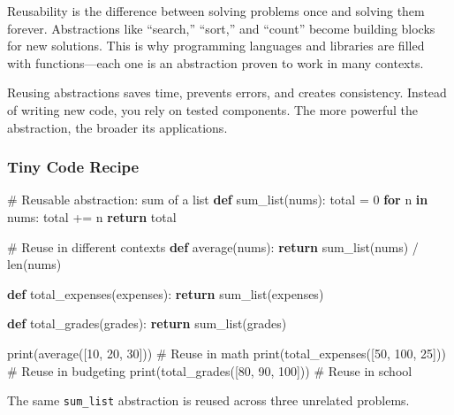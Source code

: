\documentclass[
  letterpaper,
  DIV=11,
  numbers=noendperiod]{scrreprt}
\newenvironment{Shaded}{\begin{snugshade}}{\end{snugshade}}
\newcommand{\BuiltInTok}[1]{\textcolor[rgb]{0.00,0.23,0.31}{#1}}
\newcommand{\CommentTok}[1]{\textcolor[rgb]{0.37,0.37,0.37}{#1}}
\newcommand{\ControlFlowTok}[1]{\textcolor[rgb]{0.00,0.23,0.31}{\textbf{#1}}}
\newcommand{\DecValTok}[1]{\textcolor[rgb]{0.68,0.00,0.00}{#1}}
\newcommand{\KeywordTok}[1]{\textcolor[rgb]{0.00,0.23,0.31}{\textbf{#1}}}
\newcommand{\NormalTok}[1]{\textcolor[rgb]{0.00,0.23,0.31}{#1}}
\newcommand{\OperatorTok}[1]{\textcolor[rgb]{0.37,0.37,0.37}{#1}}
\begin{document}
Reusability is the difference between solving problems once and solving
them forever. Abstractions like ``search,'' ``sort,'' and ``count''
become building blocks for new solutions. This is why programming
languages and libraries are filled with functions---each one is an
abstraction proven to work in many contexts.

Reusing abstractions saves time, prevents errors, and creates
consistency. Instead of writing new code, you rely on tested components.
The more powerful the abstraction, the broader its applications.

\subsubsection{Tiny Code Recipe}\label{tiny-code-recipe-46}

\begin{Shaded}
\begin{Highlighting}[]
\CommentTok{\# Reusable abstraction: sum of a list}
\KeywordTok{def}\NormalTok{ sum\_list(nums):}
\NormalTok{    total }\OperatorTok{=} \DecValTok{0}
    \ControlFlowTok{for}\NormalTok{ n }\KeywordTok{in}\NormalTok{ nums:}
\NormalTok{        total }\OperatorTok{+=}\NormalTok{ n}
    \ControlFlowTok{return}\NormalTok{ total}

\CommentTok{\# Reuse in different contexts}
\KeywordTok{def}\NormalTok{ average(nums):}
    \ControlFlowTok{return}\NormalTok{ sum\_list(nums) }\OperatorTok{/} \BuiltInTok{len}\NormalTok{(nums)}

\KeywordTok{def}\NormalTok{ total\_expenses(expenses):}
    \ControlFlowTok{return}\NormalTok{ sum\_list(expenses)}

\KeywordTok{def}\NormalTok{ total\_grades(grades):}
    \ControlFlowTok{return}\NormalTok{ sum\_list(grades)}

\BuiltInTok{print}\NormalTok{(average([}\DecValTok{10}\NormalTok{, }\DecValTok{20}\NormalTok{, }\DecValTok{30}\NormalTok{]))        }\CommentTok{\# Reuse in math}
\BuiltInTok{print}\NormalTok{(total\_expenses([}\DecValTok{50}\NormalTok{, }\DecValTok{100}\NormalTok{, }\DecValTok{25}\NormalTok{])) }\CommentTok{\# Reuse in budgeting}
\BuiltInTok{print}\NormalTok{(total\_grades([}\DecValTok{80}\NormalTok{, }\DecValTok{90}\NormalTok{, }\DecValTok{100}\NormalTok{]))   }\CommentTok{\# Reuse in school}
\end{Highlighting}
\end{Shaded}

The same \texttt{sum\_list} abstraction is reused across three unrelated
problems.
\end{document}

